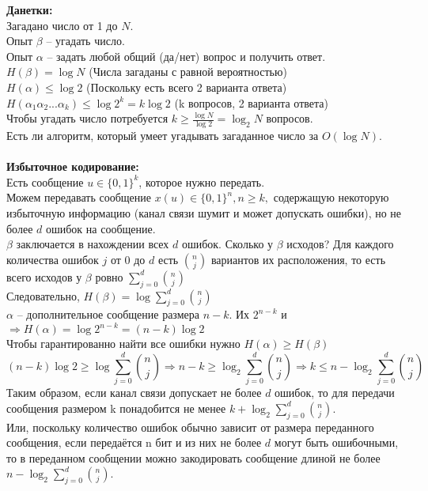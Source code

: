 	\textbf{Данетки:}\\ 
	Загадано число от 1 до $N$.\\
	Опыт $\beta$ -- угадать число.\\
	Опыт $\alpha$ -- задать любой общий (да/нет) вопрос и получить ответ.\\
	$H(\beta) = \log N$ (Числа загаданы с равной вероятностью)\\
	$H(\alpha) \leqslant \log 2$ (Поскольку есть всего 2 варианта ответа)\\
	$H(\alpha_1 \alpha_2 ... \alpha_k) \leqslant \log 2^k = k \log 2$ (k вопросов, 2 варианта ответа)\\
	Чтобы угадать число потребуется $k \geqslant \frac{\log N}{\log 2} = \log_2 N$ вопросов.\\
	Есть ли алгоритм, который умеет угадывать загаданное число за $O(\log N)$.\\ \\

	\textbf{Избыточное кодирование:}\\
	Есть сообщение $u \in \{0, 1\}^k$, которое нужно передать.\\
	Можем передавать сообщение $x(u) \in \{0, 1\}^n, n \geqslant k,$ содержащую некоторую избыточную информацию (канал связи шумит и может допускать ошибки), но не более $d$ ошибок на сообщение.\\
	$\beta$ заключается в нахождении всех $d$ ошибок. Сколько у $\beta$ исходов? Для каждого количества ошибок $j$ от 0 до $d$ есть $\binom{n}{j}$ вариантов их расположения, то есть всего исходов у $\beta$ ровно $\displaystyle \sum_{j=0}^{d} \binom{n}{j}$ \\
	Следовательно, $\displaystyle H(\beta) = \log \sum_{j=0}^{d} \binom{n}{j}$\\
	$\alpha$ -- дополнительное сообщение размера $n - k$. Их $2^{n-k}$ и $\Rightarrow H(\alpha) = \log 2^{n-k} = (n-k) \log 2$\\
	Чтобы гарантированно найти все ошибки нужно $H(\alpha) \geqslant H(\beta)$
	\[(n-k) \log 2 \geqslant \log \sum_{j=0}^{d} \binom{n}{j} \Rightarrow n-k \geqslant \log_2 \sum_{j=0}^{d} \binom{n}{j} \Rightarrow k \leqslant n - \log_2 \sum_{j=0}^{d} \binom{n}{j}\]
	Таким образом, если канал связи допускает не более $d$ ошибок, то для передачи сообщения размером k понадобится не менее $k + \log_2 \sum_{j=0}^{d} \binom{n}{j}$.\\
	Или, поскольку количество ошибок обычно зависит от размера переданного сообщения, если передаётся n бит и из них не более $d$ могут быть ошибочными, то в переданном сообщении можно закодировать сообщение длиной не более $\displaystyle n - \log_2 \sum_{j=0}^{d} \binom{n}{j}$. 
	
